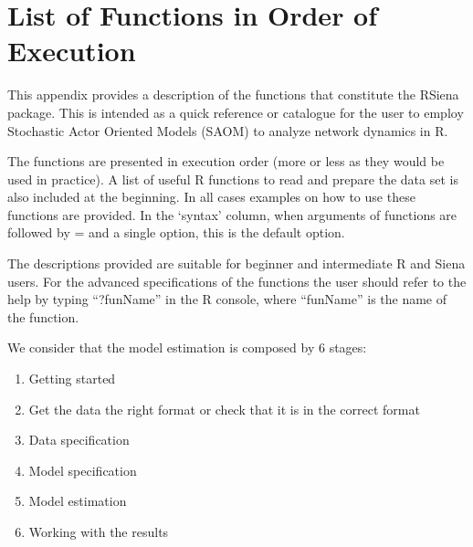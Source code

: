 \documentclass[a4paper,fleqn,11pt]{article}
\newcommand{\+}{\, + \,}
\newcommand{\R}{{\sf R }}
\newcommand{\Rn}{{\sf R}}
\newcommand{\RS}{{\sf RSiena }}
\begin{document}
{\appendix
\newpage
\section{List of Functions in Order of Execution}

    This appendix
    provides a description of the functions that constitute the
    \RS package. This is intended as a quick reference or catalogue for the
    user to employ Stochastic Actor Oriented Models (SAOM) to analyze network
    dynamics in \Rn.

    The functions are presented in execution order (more or less as
    they would be used in practice). A list of useful \R
    functions to read and prepare the data set is also included at the
    beginning. In all cases examples on how to use these functions are provided.
    In the `syntax' column,
    when arguments of functions are followed by = and a single option,
    this is the default option.

    The descriptions provided are suitable for beginner and intermediate \R and
    Siena users. For the advanced specifications of the functions the user
    should refer to the help by typing ``?funName'' in the \R console, where
    ``funName'' is the name of the function.

    We consider that the model estimation is composed by 6 stages:
\begin{enumerate}
    \item Getting started
    \item Get the data the right format or check that it is in the correct
      format
    \item Data specification
    \item Model specification
    \item   Model estimation
    \item   Working with the results
\end{enumerate}

}
\end{document}
